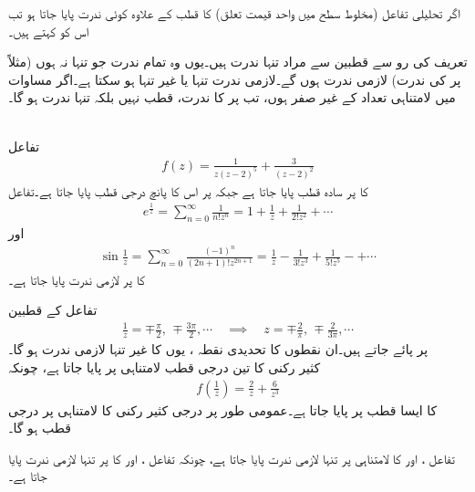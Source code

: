 اگر تحلیلی تفاعل  (مخلوط سطح میں واحد قیمت تعلق) کا قطب کے علاوہ کوئی ندرت پایا جاتا ہو تب اس کو  کہتے ہیں۔

تعریف کی رو سے قطبین سے مراد تنہا ندرت ہیں۔یوں وہ تمام ندرت جو تنہا نہ ہوں (مثلاً  پر  کی ندرت) لازمی ندرت ہوں گے۔لازمی ندرت تنہا یا غیر تنہا ہو سکتا ہے۔اگر مساوات  میں لامتناہی تعداد کے  غیر صفر ہوں، تب  پر  کا ندرت، قطب نہیں بلکہ تنہا ندرت ہو گا۔

\quad {}\\
تفاعل
\begin{align*}
f(z)=\frac{1}{z(z-2)^5}+\frac{3}{(z-2)^2}
\end{align*}
کا  پر سادہ قطب پایا جاتا ہے جبکہ  پر اس کا پانچ درجی قطب پایا جاتا ہے۔تفاعل
\begin{align}
e^{\frac{1}{z}}=\sum\limits_{n=0}^{\infty} \frac{1}{n!z^n}=1+\frac{1}{z}+\frac{1}{2!z^2}+\cdots
\end{align}
اور
\begin{align}
\sin \frac{1}{z}=\sum\limits_{n=0}^{\infty} \frac{(-1)^n}{(2n+1)!z^{2n+1}}=\frac{1}{z}-\frac{1}{3!z^3}+\frac{1}{5!z^5}-+\cdots
\end{align}
کا  پر لازمی ندرت پایا جاتا ہے۔

تفاعل  کے قطبین
\begin{align*}
\frac{1}{z}=\mp\frac{\pi}{2},\,\mp\frac{3\pi}{2},\cdots \quad \implies \quad z=\mp \frac{2}{\pi},\, \mp \frac{2}{3\pi},\cdots
\end{align*}
پر پائے جاتے ہیں۔ان نقطوں کا تحدیدی نقطہ ، یوں  کا غیر تنہا لازمی ندرت ہو گا۔
\quad {}\\
کثیر رکنی  کا تین درجی قطب لامتناہی پر پایا جاتا ہے، چونکہ
\begin{align*}
f(\frac{1}{z})=\frac{2}{z}+\frac{6}{z^3}
\end{align*}
کا ایسا قطب  پر پایا جاتا ہے۔عمومی طور پر  درجی کثیر رکنی کا لامتناہی پر  درجی قطب ہو گا۔

تفاعل ،  اور  کا لامتناہی پر تنہا لازمی ندرت پایا جاتا ہے، چونکہ تفاعل ،  اور  کا  پر تنہا لازمی ندرت پایا جاتا ہے۔

